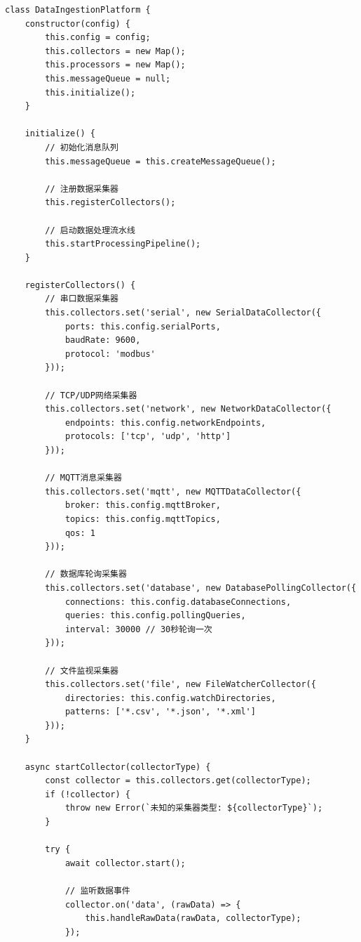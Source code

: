 \begin{lstlisting}
class DataIngestionPlatform {
    constructor(config) {
        this.config = config;
        this.collectors = new Map();
        this.processors = new Map();
        this.messageQueue = null;
        this.initialize();
    }
    
    initialize() {
        // 初始化消息队列
        this.messageQueue = this.createMessageQueue();
        
        // 注册数据采集器
        this.registerCollectors();
        
        // 启动数据处理流水线
        this.startProcessingPipeline();
    }
    
    registerCollectors() {
        // 串口数据采集器
        this.collectors.set('serial', new SerialDataCollector({
            ports: this.config.serialPorts,
            baudRate: 9600,
            protocol: 'modbus'
        }));
        
        // TCP/UDP网络采集器
        this.collectors.set('network', new NetworkDataCollector({
            endpoints: this.config.networkEndpoints,
            protocols: ['tcp', 'udp', 'http']
        }));
        
        // MQTT消息采集器
        this.collectors.set('mqtt', new MQTTDataCollector({
            broker: this.config.mqttBroker,
            topics: this.config.mqttTopics,
            qos: 1
        }));
        
        // 数据库轮询采集器
        this.collectors.set('database', new DatabasePollingCollector({
            connections: this.config.databaseConnections,
            queries: this.config.pollingQueries,
            interval: 30000 // 30秒轮询一次
        }));
        
        // 文件监视采集器
        this.collectors.set('file', new FileWatcherCollector({
            directories: this.config.watchDirectories,
            patterns: ['*.csv', '*.json', '*.xml']
        }));
    }
    
    async startCollector(collectorType) {
        const collector = this.collectors.get(collectorType);
        if (!collector) {
            throw new Error(`未知的采集器类型: ${collectorType}`);
        }
        
        try {
            await collector.start();
            
            // 监听数据事件
            collector.on('data', (rawData) => {
                this.handleRawData(rawData, collectorType);
            });
            

\end{lstlisting}
